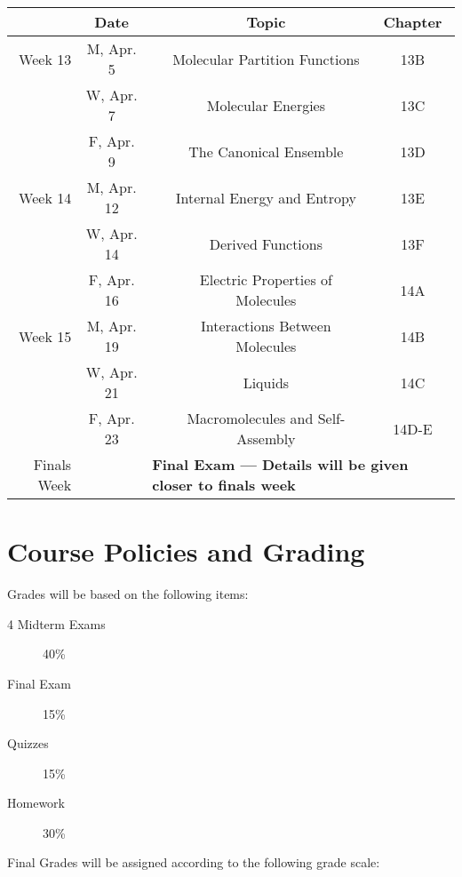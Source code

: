 \documentclass[12pt, letterpaper]{article}
\begin{document}
\noindent
\begin{tabular}{rcccc}
	            & Date       &                                                                                         & Topic                            & Chapter \\
	\midrule
	Week 13     & M, Apr. 5  &                                                                                         & Molecular Partition Functions    & 13B     \\
	            & W, Apr. 7  &                                                                                         & Molecular Energies               & 13C     \\
	            & F, Apr. 9  &                                                                                         & The Canonical Ensemble           & 13D     \\
	\midrule
	Week 14     & M, Apr. 12 &                                                                                         & Internal Energy and Entropy      & 13E     \\
	            & W, Apr. 14 &                                                                                         & Derived Functions                & 13F     \\
	            & F, Apr. 16 &                                                                                         & Electric Properties of Molecules & 14A     \\
	\midrule
	Week 15     & M, Apr. 19 &                                                                                         & Interactions Between Molecules   & 14B     \\
	            & W, Apr. 21 &                                                                                         & Liquids                          & 14C     \\
	            & F, Apr. 23 &                                                                                         & Macromolecules and Self-Assembly & 14D-E   \\
	\midrule
	Finals Week &            & \multicolumn{3}{l}{\textbf{Final Exam --- Details will be given closer to finals week}}                                              \\
\end{tabular}

\section*{Course Policies and Grading}
Grades will be based on the following items:
\begin{description}
	\item[4 Midterm Exams] 40\%
	\item[Final Exam] 15\%
	\item[Quizzes] 15\%
	\item[Homework] 30\%
\end{description}
Final Grades will be assigned according to the following grade scale:
\end{document}

